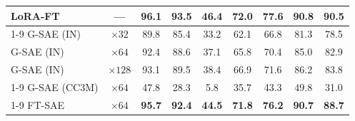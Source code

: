 \begin{table}[bp]
\begin{minipage}[t]{0.52\textwidth}
{\begin{tabular}{lc ccccccc}
\midrule
LoRA-FT          & ---         & 96.1 & 93.5 & 46.4 & 72.0 & 77.6 & 90.8 & 90.5 \\
\cmidrule(l){1-9}
G-SAE (IN)       & $\times32$  & 89.8 & 85.4 & 33.2 & 62.1 & 66.8 & 81.3 & 78.5 \\
G-SAE (IN)       & $\times64$  & 92.4 & 88.6 & 37.1 & 65.8 & 70.4 & 85.0 & 82.9 \\
G-SAE (IN)       & $\times128$ & 93.1 & 89.5 & 38.4 & 66.9 & 71.6 & 86.2 & 83.8 \\
\cmidrule(l){1-9}
G-SAE (CC3M)     & $\times64$  & 47.8 & 28.3 &  5.8 & 35.7 & 43.3 & 49.8 & 31.0 \\
\cmidrule(l){1-9}
FT-SAE           & $\times64$  & \bf 95.7 & \bf 92.4 & \bf 44.5 & \bf 71.8 & \bf 76.2 & \bf 90.7 & \bf 88.7 \\
\bottomrule
\end{tabular}%
}
\end{minipage}
\end{table}